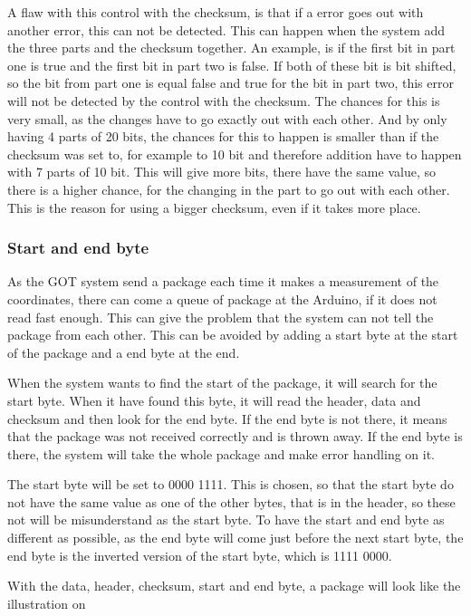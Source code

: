 A flaw with this control with the checksum, is that if a error goes out with another error, this can not be detected. This can happen when the system add the three parts and the checksum together. An example, is if the first bit in part one is true and the first bit in part two is false. If both of these bit is bit shifted, so the bit from part one is equal false and true for the bit in part two, this error will not be detected by the control with the checksum. The chances for this is very small, as the changes have to go exactly out with each other. And by only having 4 parts of 20 bits, the chances for this to happen is smaller than if the checksum was set to, for example to 10 bit and therefore addition have to happen with 7 parts of 10 bit. This will give more bits, there have the same value, so there is a higher chance, for the changing in the part to go out with each other. This is the reason for using a bigger checksum, even if it takes more place.

\subsubsection{Start and end byte}
As the GOT system send a package each time it makes a measurement of the coordinates, there can come a queue of package at the Arduino, if it does not read fast enough. This can give the problem that the system can not tell the package from each other. This can be avoided by adding a start byte at the start of the package and a end byte at the end. 

When the system wants to find the start of the package, it will search for the start byte. When it have found this byte, it will read the header, data and checksum and then look for the end byte. If the end byte is not there, it means that the package was not received correctly and is thrown away. If the end byte is there, the system will take the whole package and make error handling on it. 

The start byte will be set to 0000 1111. This is chosen, so that the start byte do not have the same value as one of the other bytes, that is in the header, so these not will be misunderstand as the start byte. To have the start and end byte as different as possible, as the end byte will come just before the next start byte, the end byte is the inverted version of the start byte, which is 1111 0000.

With the data, header, checksum, start and end byte, a package will look like the illustration on 

